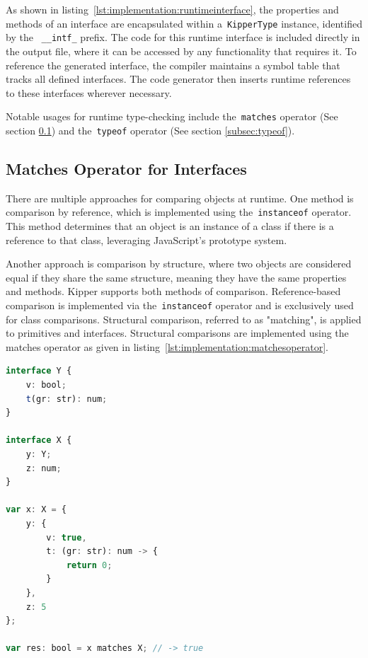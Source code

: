 As shown in listing~\ref{lst:implementation:runtimeinterface}, the properties and methods of an interface are encapsulated within a~\lstinline|KipperType| instance, identified by the ~\lstinline|__intf_| prefix. The code for this runtime interface is included directly in the output file, where it can be accessed by any functionality that requires it. To reference the generated interface, the compiler maintains a symbol table that tracks all defined interfaces. The code generator then inserts runtime references to these interfaces wherever necessary.

Notable usages for runtime type-checking include the~\lstinline|matches| operator (See section \ref{subsec:matches}) and the~\lstinline|typeof| operator (See section \ref{subsec:typeof}).

\subsection{Matches Operator for Interfaces}
\label{subsec:matches}

There are multiple approaches for comparing objects at runtime. One method is comparison by reference, which is implemented using the~\lstinline|instanceof| operator. This method determines that an object is an instance of a class if there is a reference to that class, leveraging JavaScript's prototype system.

Another approach is comparison by structure, where two objects are considered equal if they share the same structure, meaning they have the same properties and methods. Kipper supports both methods of comparison. Reference-based comparison is implemented via the~\lstinline|instanceof| operator and is exclusively used for class comparisons. Structural comparison, referred to as "matching", is applied to primitives and interfaces. Structural comparisons are implemented using the matches operator as given in listing~\ref{lst:implementation:matchesoperator}.

\begin{lstlisting}[language=Typescript,caption=The Kipper matches operator,label=lst:implementation:matchesoperator]
interface Y {
	v: bool;
	t(gr: str): num;
}

interface X {
	y: Y;
	z: num;
}

var x: X = {
	y: {
		v: true,
		t: (gr: str): num -> {
			return 0;
		}
	},
	z: 5
};

var res: bool = x matches X; // -> true
\end{lstlisting}

